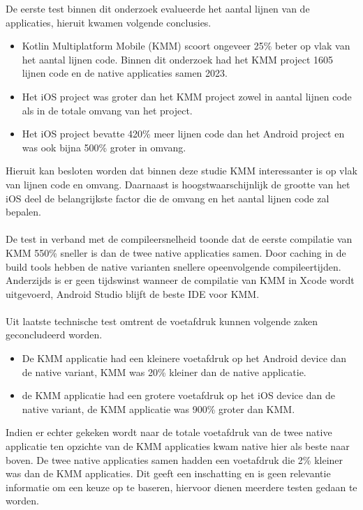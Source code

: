 De eerste test binnen dit onderzoek evalueerde het aantal lijnen van de applicaties, hieruit kwamen volgende conclusies.
\begin{itemize}
    \item Kotlin Multiplatform Mobile (KMM) scoort ongeveer 25\% beter op vlak van het aantal lijnen code. Binnen dit onderzoek had het KMM project 1605 lijnen code en de native applicaties samen 2023.
    \item Het iOS project was groter dan het KMM project zowel in aantal lijnen code als in de totale omvang van het project.
    \item Het iOS project bevatte 420\% meer lijnen code dan het Android project en was ook bijna 500\% groter in omvang.
\end{itemize}
Hieruit kan besloten worden dat binnen deze studie KMM interessanter is op vlak van lijnen code en omvang. Daarnaast is hoogstwaarschijnlijk de grootte van het iOS deel de belangrijkste factor die de omvang en het aantal lijnen code zal bepalen.
\\ \\ 
De test in verband met de compileersnelheid toonde dat de eerste compilatie van KMM 550\% sneller is dan de twee native applicaties samen. Door caching in de build tools hebben de native varianten snellere opeenvolgende compileertijden. Anderzijds is er geen tijdswinst wanneer de compilatie van KMM in Xcode wordt uitgevoerd, Android Studio blijft de beste IDE voor KMM.
\\ \\ 
Uit laatste technische test omtrent de voetafdruk kunnen volgende zaken geconcludeerd worden.
\begin{itemize}
    \item De KMM applicatie had een kleinere voetafdruk op het Android device dan de native variant, KMM was 20\% kleiner dan de native applicatie.
    \item de KMM applicatie had een grotere voetafdruk op het iOS device dan de native variant, de KMM applicatie was 900\% groter dan KMM.
\end{itemize}
Indien er echter gekeken wordt naar de totale voetafdruk van de twee native applicatie ten opzichte van de KMM applicaties kwam native hier als beste naar boven. De twee native applicaties samen hadden een voetafdruk die 2\% kleiner was dan de KMM applicaties. Dit geeft een inschatting en is geen relevantie informatie om een keuze op te baseren, hiervoor dienen meerdere testen gedaan te worden.
\\ \\
